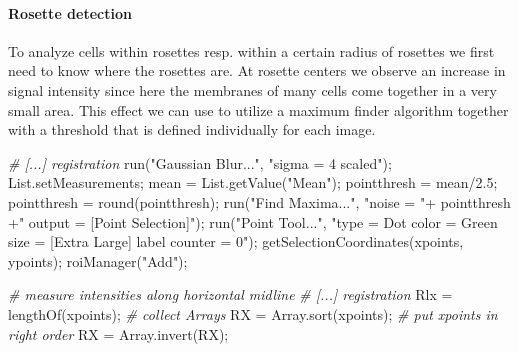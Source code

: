 \documentclass[10pt, b5paper, singlespacinge, twoside]{reedthesis} %
\newenvironment{Shaded}{}{}
\newcommand{\CommentTok}[1]{\textit{#1}}
\newcommand{\FloatTok}[1]{#1}
\newcommand{\FunctionTok}[1]{#1}
\newcommand{\NormalTok}[1]{#1}
\newcommand{\OtherTok}[1]{#1}
\newcommand{\SpecialCharTok}[1]{#1}
\newcommand{\StringTok}[1]{#1}
\theoremstyle{definition}
\theoremstyle{definition}
\theoremstyle{definition}
\theoremstyle{remark}
\begin{document}
\hypertarget{rosette-detection}{%
\paragraph{Rosette detection}\label{rosette-detection}}

To analyze cells within rosettes resp. within a certain radius of rosettes we first need to know where the rosettes are. At rosette centers we observe an increase in signal intensity since here the membranes of many cells come together in a very small area. This effect we can use to utilize a maximum finder algorithm together with a threshold that is defined individually for each image.

\scriptsize
\begin{Shaded}
\begin{Highlighting}[numbers=left,,]
\CommentTok{\#  [...] registration}
    \FunctionTok{run}\NormalTok{(}\StringTok{"Gaussian Blur..."}\NormalTok{, }\StringTok{"sigma = 4 scaled"}\NormalTok{);}
\NormalTok{    List.setMeasurements;}
\NormalTok{    mean }\OtherTok{=} \FunctionTok{List.getValue}\NormalTok{(}\StringTok{"Mean"}\NormalTok{);}
\NormalTok{    pointthresh }\OtherTok{=}\NormalTok{ mean}\SpecialCharTok{/}\FloatTok{2.5}\NormalTok{;}
\NormalTok{    pointthresh }\OtherTok{=} \FunctionTok{round}\NormalTok{(pointthresh);}
    \FunctionTok{run}\NormalTok{(}\StringTok{"Find Maxima..."}\NormalTok{, }\StringTok{"noise = "}\SpecialCharTok{+}\NormalTok{ pointthresh }\SpecialCharTok{+}\StringTok{" output = [Point Selection]"}\NormalTok{);}
    \FunctionTok{run}\NormalTok{(}\StringTok{"Point Tool..."}\NormalTok{, }\StringTok{"type = Dot color = Green size = [Extra Large] label counter = 0"}\NormalTok{);}
    \FunctionTok{getSelectionCoordinates}\NormalTok{(xpoints, ypoints);}
    \FunctionTok{roiManager}\NormalTok{(}\StringTok{"Add"}\NormalTok{);}

\CommentTok{\# measure intensities along horizontal midline}
\CommentTok{\#   [...] registration}
\NormalTok{    Rlx }\OtherTok{=} \FunctionTok{lengthOf}\NormalTok{(xpoints); }\CommentTok{\# collect Arrays}
\NormalTok{    RX }\OtherTok{=} \FunctionTok{Array.sort}\NormalTok{(xpoints); }\CommentTok{\# put xpoints in right order}
\NormalTok{    RX }\OtherTok{=} \FunctionTok{Array.invert}\NormalTok{(RX);}


\end{Highlighting}
\end{Shaded}
\end{document}
